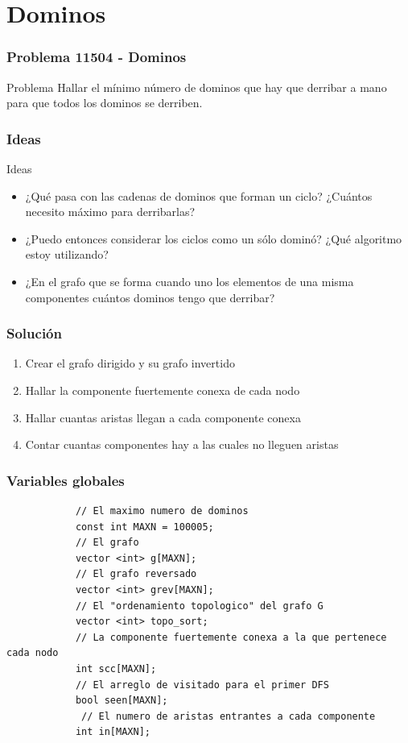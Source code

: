 \documentclass{beamer}
\begin{document}
\section{Dominos}
	\begin{frame}
		\frametitle{Problema 11504 - Dominos}
		\begin{block}{Problema}
			Hallar el mínimo número de dominos que hay que derribar a mano para que todos los dominos se derriben.
		\end{block}
	\end{frame}
	
	\begin{frame}
		\frametitle{Ideas}
		\begin{alertblock}{Ideas}
			\begin{itemize}
				\item ¿Qué pasa con las cadenas de dominos que forman un ciclo? ¿Cuántos necesito máximo para derribarlas? \pause
				\item ¿Puedo entonces considerar los ciclos como un sólo dominó? ¿Qué algoritmo estoy utilizando? \pause
				\item ¿En el grafo que se forma cuando uno los elementos de una misma componentes cuántos dominos tengo que derribar?
			\end{itemize}
		\end{alertblock}
	\end{frame}
	
	\begin{frame}
		\frametitle{Solución}
		\begin{enumerate}
			\item Crear el grafo dirigido y su grafo invertido
			\item Hallar la componente fuertemente conexa de cada nodo
			\item Hallar cuantas aristas llegan a cada componente conexa
			\item Contar cuantas componentes hay a las cuales no lleguen aristas
		\end{enumerate}
	\end{frame}
	
	\begin{frame}[fragile]
		\frametitle{Variables globales}
		\begin{lstlisting}
			// El maximo numero de dominos
			const int MAXN = 100005; 
			// El grafo
			vector <int> g[MAXN];
			// El grafo reversado    
			vector <int> grev[MAXN];
			// El "ordenamiento topologico" del grafo G 
			vector <int> topo_sort;  
			// La componente fuertemente conexa a la que pertenece cada nodo
			int scc[MAXN];  
			// El arreglo de visitado para el primer DFS         
			bool seen[MAXN];
			 // El numero de aristas entrantes a cada componente         
			int in[MAXN];           
		\end{lstlisting}
	\end{frame}
	
\end{document}
